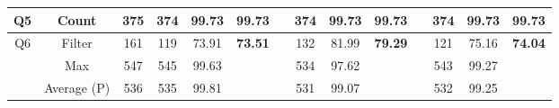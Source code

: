 \begin{table}
\begin{tabular}{cccccclccclccc}
Q5                              & Count                               & 375                                   & 374                                                                    & 99.73                                                                     & \textbf{99.73}                  &                      & 374                                                                    & 99.73                                                                     & \textbf{99.73}                  &                      & 374                                                                    & 99.73                                                                     & \textbf{99.73}                  \\ \hline
\multirow{3}{*}{Q6}             & Filter                              & 161                                   & 119                                                                    & 73.91                                                                     & \multirow{3}{*}{\textbf{73.51}} &                      & 132                                                                    & 81.99                                                                     & \multirow{3}{*}{\textbf{79.29}} &                      & 121                                                                    & 75.16                                                                     & \multirow{3}{*}{\textbf{74.04}} \\
                                & Max                                 & 547                                   & 545                                                                    & 99.63                                                                     &                                 &                      & 534                                                                    & 97.62                                                                     &                                 &                      & 543                                                                    & 99.27                                                                     &                                 \\
                                & Average (P)                         & 536                                   & 535                                                                    & 99.81                                                                     &                                 &                      & 531                                                                    & 99.07                                                                     &                                 &                      & 532                                                                    & 99.25                                                                     &                                 \\ \hline
\end{tabular}
\end{table}


